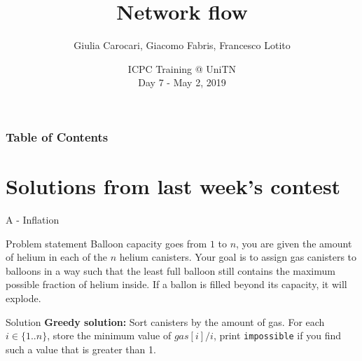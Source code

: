\documentclass{beamer}
\title{Network flow}
\author[Carocari, Fabris, Lotito]
{Giulia Carocari, Giacomo Fabris, Francesco Lotito}
\institute[UniTN]{Università degli Studi di Trento}
\date[May 2, 2019]
{ICPC Training @ UniTN\\ Day 7 - May 2, 2019}
\begin{document}
\frame{\titlepage}
\begin{frame} 
    \frametitle{Table of Contents}
    \tableofcontents
\end{frame}

\section{Solutions from last week's contest}

    \begin{frame}{A - Inflation}
        \begin{block}{Problem statement}
            Balloon capacity goes from $1$ to $n$, you are given the amount of helium in
            each of the $n$ helium canisters. Your goal is to assign gas canisters to balloons in 
            a way such that the least full balloon still contains the maximum possible fraction 
            of helium inside. If a ballon is filled beyond its capacity, it will explode.
        \end{block}
        \pause
        \begin{block}{Solution}
            \textbf{Greedy solution:}
            Sort canisters by the amount of gas. For each $i\in \{1..n\}$, store the minimum
            value of $gas[i]/i$, print \texttt{impossible} if you find such a value that is 
            greater than 1.
        \end{block}
    \end{frame}
\end{document}
